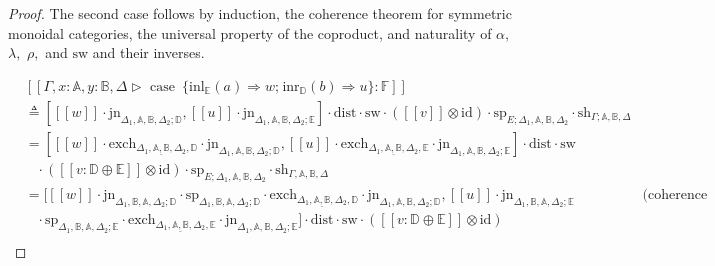 \documentclass[10pt,a4paper]{amsart}
\theoremstyle{definition}
\theoremstyle{definition}
\theoremstyle{definition}
\theoremstyle{definition}
\theoremstyle{definition}
\theoremstyle{definition}
\begin{document}
\begin{proof}
The second case follows by induction, the coherence theorem for symmetric monoidal categories, the universal property of the coproduct, and naturality of $\alpha,$ $\lambda,$ $\rho,$ and $\text{sw}$ and their inverses.

\begin{align*}
  & [\![\Gamma,x:\mathbb{A}, y:\mathbb{B}, \Delta \triangleright \text{ case }  \hspace{2pt}  \{\text{inl}_{\mathbb{E}} (a) \Rightarrow w ; \hspace{1pt} \text{inr}_{\mathbb{D}} (b) \Rightarrow u\}: \mathbb{F}]\!] \\
  & \triangleq    \left[[\![ w ]\!] \cdot  \text{jn}_{\Delta_{1},\mathbb{A},\mathbb{B},  \Delta_{2};\mathbb{D}},[\![ u ]\!] \cdot  \text{jn}_{\Delta_{1},\mathbb{A},\mathbb{B},  \Delta_{2};\mathbb{E}}\right]   \cdot \text{dist} \cdot \text{sw} \cdot ([\![v]\!] \otimes \text{id}) \cdot \text{sp}_{E; \Delta_{1},\mathbb{A},\mathbb{B},  \Delta_{2}} \cdot \text{sh}_{\Gamma;\mathbb{A}, \mathbb{B},\Delta}  \\
  & = [[\![ w ]\!]  \cdot \text{exch}_{\Delta_{1},\underline{\mathbb{A},\mathbb{B}},  \Delta_{2},\mathbb{D}} \cdot \text{jn}_{\Delta_{1},\mathbb{A},\mathbb{B},  \Delta_{2};\mathbb{D}},    [\![u ]\!] \cdot \text{exch}_{\Delta_{1},\underline{\mathbb{A},\mathbb{B}},  \Delta_{2},\mathbb{E}} \cdot \text{jn}_{\Delta_{1},\mathbb{A},\mathbb{B},  \Delta_{2};\mathbb{E}} ] \cdot \text{dist} \cdot \text{sw} \\
  & \hspace{10pt} \cdot ([\![  v : \mathbb{D} \oplus \mathbb{E}  ]\!] \otimes \text{id}) \cdot\text{sp}_{E; \Delta_{1},\mathbb{A},\mathbb{B},  \Delta_{2}} \cdot \text{sh}_{\Gamma,\mathbb{A}, \mathbb{B},\Delta} \\
  & = [[\![ w ]\!] \cdot \text{jn}_{\Delta_{1} ,\mathbb{B},\mathbb{A},  \Delta_{2};\mathbb{D}} \cdot \text{sp}_{\Delta_{1}, \mathbb{B}, \mathbb{A}, \Delta_{2};\mathbb{D}} \cdot  \text{exch}_{\Delta_{1},\underline{\mathbb{A},\mathbb{B}},  \Delta_{2},\mathbb{D}} \cdot  \text{jn}_{\Delta_{1},\mathbb{A},\mathbb{B},  \Delta_{2};\mathbb{D}}  ,    [\![u ]\!] \cdot \text{jn}_{\Delta_{1} ,\mathbb{B},\mathbb{A},  \Delta_{2};\mathbb{E}} & {\text{(coherence )}} \\
  & \hspace{10pt} \cdot \text{sp}_{\Delta_{1}, \mathbb{B}, \mathbb{A}, \Delta_{2};\mathbb{E}} \cdot  \text{exch}_{\Delta_{1},\underline{\mathbb{A},\mathbb{B}},  \Delta_{2},\mathbb{E}} \cdot  \text{jn}_{\Delta_{1},\mathbb{A},\mathbb{B},  \Delta_{2};\mathbb{E}} ] \cdot \text{dist} \cdot \text{sw} \cdot ([\![  v : \mathbb{D} \oplus \mathbb{E}  ]\!] \otimes \text{id}) \\

\end{align*}
\end{proof}
\end{document}
